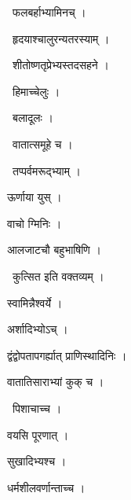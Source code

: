 \documentclass[10pt, openany, oneside]{book}
\begin{document}
\par\noindent\hspace{1.5em}{\vps वा॰}~{\qt फलबर्हाभ्यामिनच् ।}

\par\noindent\hspace{1.5em}{\vps वा॰}~{\qt हृदयाश्चालुरन्यतरस्याम् ।}

\par\noindent\hspace{1.5em}{\vps वा॰}~{\qt शीतोष्णतृप्रेभ्यस्तदसहने ।}

\par\noindent\hspace{1.5em}{\vps वा॰}~{\qt हिमाच्चेलुः ।}

\par\noindent\hspace{1.5em}{\vps वा॰}~{\qt बलादूलः ।}

\par\noindent\hspace{1.5em}{\vps वा॰}~{\qt वातात्समूहे च ।}

\par\noindent\hspace{1.5em}{\vps वा॰}~{\qt तप्पर्वमरूद्भ्याम् ।}

\noindent ऊर्णाया युस् ।

\noindent वाचो ग्मिनिः ।

\noindent आलजाटचौ बहुभाषिणि ।

\par\noindent\hspace{1.5em}{\vps वा॰}~{\qt कुत्सित इति वक्तव्यम् ।}

\noindent स्वामिन्नैश्वर्ये ।

\noindent अर्शादिभ्योऽच् ।

\noindent द्वंद्वोपतापगर्ह्यात् प्राणिस्थादिनिः ।

\noindent वातातिसाराभ्यां कुक् च ।

\par\noindent\hspace{1.5em}{\vps वा॰}~{\qt पिशाचाच्च ।}

\noindent वयसि पूरणात् ।

\noindent सुखादिभ्यश्च ।

\noindent धर्मशीलवर्णान्ताच्च ।
\end{document}
